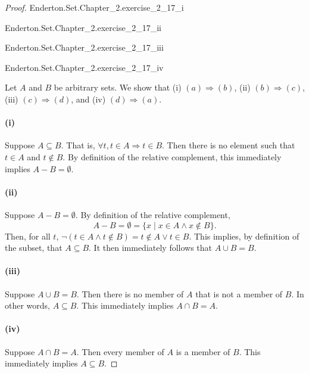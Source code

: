 \documentclass{report}
\begin{document}
\begin{proof}

  \statementpadding

    {Enderton.Set.Chapter\_2.exercise\_2\_17\_i}

    {Enderton.Set.Chapter\_2.exercise\_2\_17\_ii}

    {Enderton.Set.Chapter\_2.exercise\_2\_17\_iii}

    {Enderton.Set.Chapter\_2.exercise\_2\_17\_iv}

  Let $A$ and $B$ be arbitrary sets.
  We show that (i) $(a) \Rightarrow (b)$, (ii) $(b) \Rightarrow (c)$, (iii)
    $(c) \Rightarrow (d)$, and (iv) $(d) \Rightarrow (a)$.

  \paragraph{(i)}%

    Suppose $A \subseteq B$.
    That is, $\forall t, t \in A \Rightarrow t \in B$.
    Then there is no element such that $t \in A$ and $t \not\in B$.
    By definition of the relative complement, this immediately implies
      $A - B = \emptyset$.

  \paragraph{(ii)}%

    Suppose $A - B = \emptyset$.
    By definition of the relative complement,
      $$A - B = \emptyset = \{ x \mid x \in A \land x \not\in B \}.$$
    Then, for all $t$,
      $\neg(t \in A \land t \not\in B) = t \not\in A \lor t \in B$.
    This implies, by definition of the subset, that $A \subseteq B$.
    It then immediately follows that $A \cup B = B$.

  \paragraph{(iii)}%

    Suppose $A \cup B = B$.
    Then there is no member of $A$ that is not a member of $B$.
    In other words, $A \subseteq B$.
    This immediately implies $A \cap B = A$.

  \paragraph{(iv)}%

    Suppose $A \cap B = A$.
    Then every member of $A$ is a member of $B$.
    This immediately implies $A \subseteq B$.

\end{proof}
\end{document}
